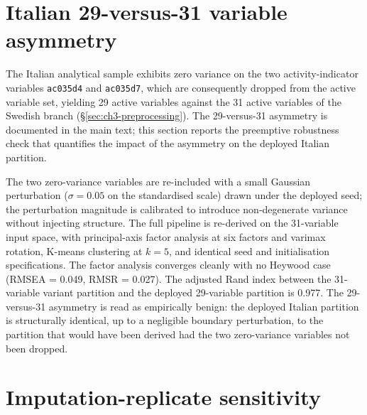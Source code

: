 \section{Italian 29-versus-31 variable asymmetry}
\label{sec:appx-sens-29-31}

The Italian analytical sample exhibits zero variance on the two activity-indicator variables \texttt{ac035d4} and \texttt{ac035d7}, which are consequently dropped from the active variable set, yielding 29 active variables against the 31 active variables of the Swedish branch (\S\ref{sec:ch3-preprocessing}). The 29-versus-31 asymmetry is documented in the main text; this section reports the preemptive robustness check that quantifies the impact of the asymmetry on the deployed Italian partition.

The two zero-variance variables are re-included with a small Gaussian perturbation ($\sigma = 0.05$ on the standardised scale) drawn under the deployed seed; the perturbation magnitude is calibrated to introduce non-degenerate variance without injecting structure. The full pipeline is re-derived on the 31-variable input space, with principal-axis factor analysis at six factors and varimax rotation, K-means clustering at $k = 5$, and identical seed and initialisation specifications. The factor analysis converges cleanly with no Heywood case (RMSEA = 0.049, RMSR = 0.027). The adjusted Rand index between the 31-variable variant partition and the deployed 29-variable partition is 0.977. The 29-versus-31 asymmetry is read as empirically benign: the deployed Italian partition is structurally identical, up to a negligible boundary perturbation, to the partition that would have been derived had the two zero-variance variables not been dropped.


\section{Imputation-replicate sensitivity}
\label{sec:appx-sens-imputation}

